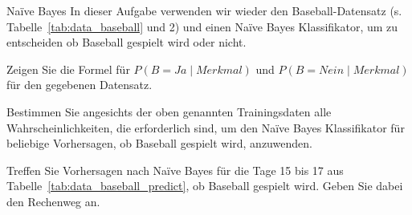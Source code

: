 \begin{task}[credit=19]{Na\"ive Bayes}
In dieser Aufgabe verwenden wir wieder den Baseball-Datensatz (s. Tabelle~\ref{tab:data_baseball} und 2) und einen Na\"ive Bayes Klassifikator, um zu entscheiden ob Baseball gespielt wird oder nicht.

\begin{subtask}[title={Formel für Merkmalsausprägung},points=4]
Zeigen Sie die Formel für $P(B=Ja \mid Merkmal)$ und  $P(B=Nein \mid Merkmal) $ für den gegebenen Datensatz.

\begin{solution}
\end{solution}
\end{subtask}
 
\begin{subtask}[title=Wahrscheinlichkeiten,points=6]
Bestimmen Sie angesichts der oben genannten Trainingsdaten alle Wahrscheinlichkeiten, die erforderlich sind, um den Na\"ive Bayes Klassifikator für beliebige Vorhersagen, ob Baseball gespielt wird, anzuwenden.

\begin{solution}
\end{solution}
\end{subtask}

\begin{subtask}[points=9,title=Vorhersage]
Treffen Sie Vorhersagen nach Na\"ive Bayes für die Tage 15 bis 17 aus Tabelle~\ref{tab:data_baseball_predict}, ob Baseball gespielt wird.
Geben Sie dabei den Rechenweg an.
\begin{solution}
\end{solution}
\end{subtask}

\end{task}
